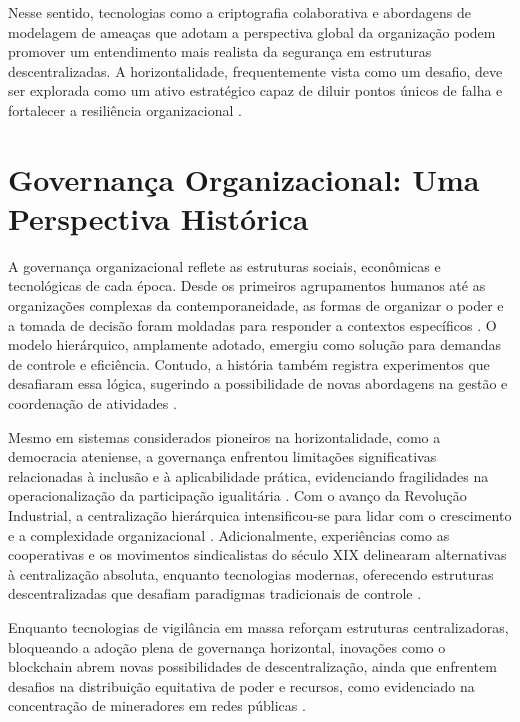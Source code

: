 Nesse sentido, tecnologias como a criptografia colaborativa \cite{Colbac,
AbcCrypto} e abordagens de modelagem de ameaças que adotam a perspectiva global
da organização podem promover um entendimento mais realista da segurança em
estruturas descentralizadas. A horizontalidade, frequentemente vista como
um desafio, deve ser explorada como um ativo estratégico capaz de diluir
pontos únicos de falha e fortalecer a resiliência organizacional \cite{EverydayRevolutions}.

\section{Governança Organizacional: Uma Perspectiva Histórica}
\label{sec:contexto_historico}

A governança organizacional reflete as estruturas sociais, econômicas e
tecnológicas de cada época. Desde os primeiros agrupamentos humanos até as
organizações complexas da contemporaneidade, as formas de organizar o poder
e a tomada de decisão foram moldadas para responder a contextos
específicos \cite{Non-HierarchicalForms}. O modelo hierárquico,
amplamente adotado, emergiu como solução para demandas de
controle e eficiência. Contudo, a história também registra
experimentos que desafiaram essa lógica, sugerindo a possibilidade de novas
abordagens na gestão e coordenação de atividades
\cite{WorkerCooperativesinAmerica, WorkerCooperativesandRevolution}.

Mesmo em sistemas considerados pioneiros na horizontalidade, como a
democracia ateniense, a governança enfrentou limitações significativas
relacionadas à inclusão e à aplicabilidade prática, evidenciando
fragilidades na operacionalização da participação igualitária
\cite{AthenianDemocracyABrief}. Com o avanço da Revolução Industrial, a
centralização hierárquica intensificou-se para lidar com o crescimento e a
complexidade organizacional \cite{WorkerCooperativesandRevolution}.
Adicionalmente, experiências como as cooperativas e os movimentos
sindicalistas do século XIX delinearam alternativas à centralização absoluta,
enquanto tecnologias modernas, oferecendo estruturas descentralizadas que desafiam paradigmas
tradicionais de controle \cite{WorkerCooperativesinAmerica, EverydayRevolutions}.

Enquanto tecnologias de vigilância em massa reforçam estruturas
centralizadoras, bloqueando a adoção plena de governança horizontal,
inovações como o blockchain abrem novas possibilidades de descentralização,
ainda que enfrentem desafios na distribuição equitativa de poder e
recursos, como evidenciado na concentração de mineradores em redes públicas
\cite{DoArtifactsHavePolitics}.

